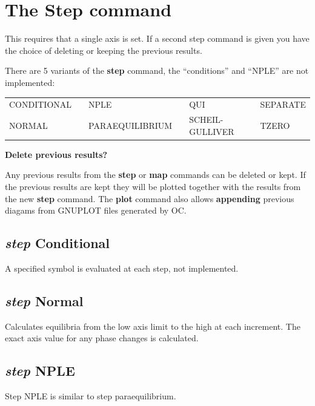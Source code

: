 \documentclass[11pt]{article}
\begin{document}
\hypertarget{Step}{}
\section{The Step command}\label{sc:step}

This requires that a single axis is set.  If a second step command is
given you have the choice of deleting or keeping the previous results.

There are 5 variants of the {\bf step} command, the ``conditions'' and
``NPLE'' are not implemented:

\begin{tabular}{llll}
 CONDITIONAL~~ & NPLE              & QUI              & SEPARATE\\
 NORMAL        & PARAEQUILIBRIUM~~ & SCHEIL-GULLIVER~~& TZERO
\end{tabular}

\hypertarget{Step old data}{{\bf Delete previous results?}}

Any previous results from the {\bf step} or {\bf map} commands can be
deleted or kept.  If the previous results are kept they will be
plotted together with the results from the new {\bf step} command.
The {\bf plot} command also allows {\bf appending} previous diagams
from GNUPLOT files generated by OC.

\hypertarget{Step conditional}{}
\subsection{{\em step} Conditional}

A specified symbol is evaluated at each step, not implemented.

\hypertarget{Step normal}{}
\subsection{{\em step} Normal}

Calculates equilibria from the low axis limit to the high at each
increment.  The exact axis value for any phase changes is calculated.

\hypertarget{Step NPLE}{}
\subsection{{\em step} NPLE}

Step NPLE is similar to step paraequilibrium.
\end{document}
